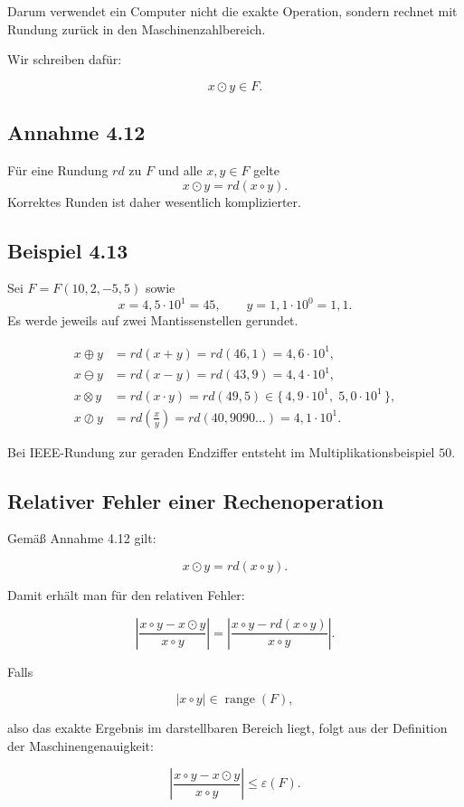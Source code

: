 \documentclass{article}
\begin{document}
Darum verwendet ein Computer nicht die exakte Operation,
sondern rechnet mit Rundung zurück in den Maschinenzahlbereich.

Wir schreiben dafür:

\[
x \odot y \in F.
\]

\subsection*{Annahme 4.12}

Für eine Rundung \(rd\) zu \(F\) und alle \(x,y\in F\) gelte
\[
x\odot y = rd(x\circ y).
\]
Korrektes Runden ist daher wesentlich komplizierter.

\subsection*{Beispiel 4.13}

Sei \(F=F(10,2,-5,5)\) sowie
\[
x=4{,}5\cdot 10^1=45,
\qquad
y=1{,}1\cdot 10^0=1{,}1.
\]
Es werde jeweils auf zwei Mantissenstellen gerundet.

\begin{align*}
x\oplus y &= rd(x+y)=rd(46{,}1)=4{,}6\cdot 10^1,\\
x\ominus y &= rd(x-y)=rd(43{,}9)=4{,}4\cdot 10^1,\\
x\otimes y &= rd(x\cdot y)=rd(49{,}5)
\in \{\,4{,}9\cdot 10^1,\;5{,}0\cdot 10^1\,\},\\
x\oslash y &= rd\!\left(\frac{x}{y}\right)
=rd(40{,}9090\ldots)=4{,}1\cdot 10^1.
\end{align*}

Bei IEEE-Rundung zur geraden Endziffer entsteht im Multiplikationsbeispiel \(50\).


\subsection*{Relativer Fehler einer Rechenoperation}

Gemäß Annahme 4.12 gilt:

\[
x\odot y = rd(x\circ y).
\]

Damit erhält man für den relativen Fehler:

\[
\left|
\frac{x\circ y - x\odot y}{x\circ y}
\right|
=
\left|
\frac{x\circ y - rd(x\circ y)}{x\circ y}
\right|.
\]

Falls

\[
|x\circ y|\in \operatorname{range}(F),
\]

also das exakte Ergebnis im darstellbaren Bereich liegt, folgt aus der
Definition der Maschinengenauigkeit:

\[
\left|
\frac{x\circ y - x\odot y}{x\circ y}
\right|
\leq \varepsilon(F).
\]
\end{document}
